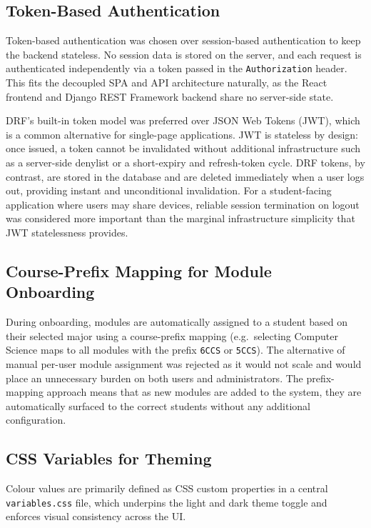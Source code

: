 \subsection{Token-Based Authentication}

Token-based authentication was chosen over session-based authentication to keep the backend stateless. No session data is stored on the server, and each request is authenticated independently via a token passed in the \texttt{Authorization} header. This fits the decoupled SPA and API architecture naturally, as the React frontend and Django REST Framework backend share no server-side state.

DRF's built-in token model was preferred over JSON Web Tokens (JWT), which is a common alternative for single-page applications. JWT is stateless by design: once issued, a token cannot be invalidated without additional infrastructure such as a server-side denylist or a short-expiry and refresh-token cycle. DRF tokens, by contrast, are stored in the database and are deleted immediately when a user logs out, providing instant and unconditional invalidation. For a student-facing application where users may share devices, reliable session termination on logout was considered more important than the marginal infrastructure simplicity that JWT statelessness provides.

\subsection{Course-Prefix Mapping for Module Onboarding}

During onboarding, modules are automatically assigned to a student based on their selected major using a course-prefix mapping (e.g.\ selecting Computer Science maps to all modules with the prefix \texttt{6CCS} or \texttt{5CCS}). The alternative of manual per-user module assignment was rejected as it would not scale and would place an unnecessary burden on both users and administrators. The prefix-mapping approach means that as new modules are added to the system, they are automatically surfaced to the correct students without any additional configuration.

\subsection{CSS Variables for Theming}

Colour values are primarily defined as CSS custom properties in a central \texttt{variables.css} file, which underpins the light and dark theme toggle and enforces visual consistency across the UI.


